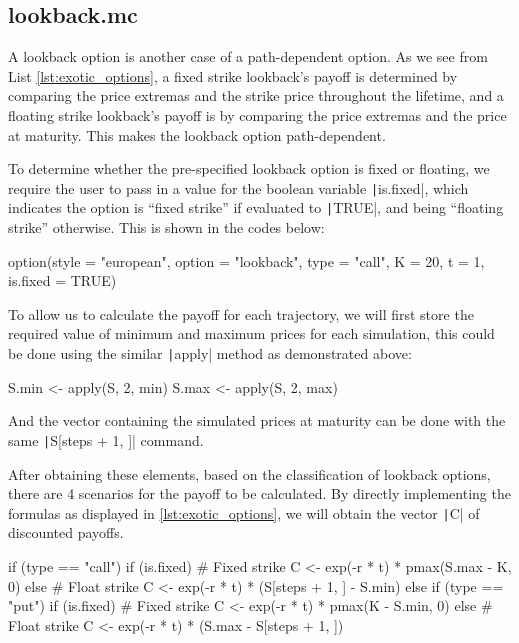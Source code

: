 \subsection{lookback.mc}

A lookback option is another case of a path-dependent option. As we see from List \ref{lst:exotic_options}, a fixed strike lookback's payoff is determined by comparing the price extremas and the strike price throughout the lifetime, and a floating strike lookback's payoff is by comparing the price extremas and the price at maturity. This makes the lookback option path-dependent.

To determine whether the pre-specified lookback option is fixed or floating, we require the user to pass in a value for the boolean variable \texttt|is.fixed|, which indicates the option is ``fixed strike'' if evaluated to \texttt|TRUE|, and being ``floating strike'' otherwise. This is shown in the codes below:

\begin{Rminted}
option(style = "european", option = "lookback", type = "call", K = 20, t = 1, is.fixed = TRUE)
\end{Rminted}

To allow us to calculate the payoff for each trajectory, we will first store the required value of minimum and maximum prices for each simulation, this could be done using the similar \texttt|apply| method as demonstrated above:

\begin{Rminted}
S.min <- apply(S, 2, min)
S.max <- apply(S, 2, max)
\end{Rminted}

And the vector containing the simulated prices at maturity can be done with the same \texttt|S[steps + 1, ]| command.

After obtaining these elements, based on the classification of lookback options, there are 4 scenarios for the payoff to be calculated. By directly implementing the formulas as displayed in \ref{lst:exotic_options}, we will obtain the vector \texttt|C| of discounted payoffs.

\begin{Rminted}
if (type == "call") {
    if (is.fixed) { # Fixed strike
        C <- exp(-r * t) * pmax(S.max - K, 0)
    } else { # Float strike
        C <- exp(-r * t) * (S[steps + 1, ] - S.min)
    }
} else if (type == "put") {
    if (is.fixed) { # Fixed strike
        C <- exp(-r * t) * pmax(K - S.min, 0)
    } else { # Float strike
        C <- exp(-r * t) * (S.max - S[steps + 1, ])
    }
}
\end{Rminted}

\newpage